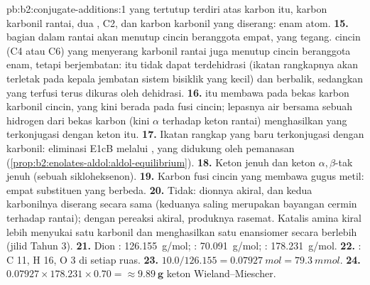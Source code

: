 \begin{solution}{pb:b2:conjugate-additions:1}
yang tertutup terdiri atas karbon itu, karbon karbonil rantai, dua ,
C2, dan karbon karbonil yang diserang: enam atom.
\textbf{15.}   bagian dalam rantai akan menutup cincin
beranggota empat, yang tegang.  cincin (C4 atau C6) yang menyerang
karbonil rantai juga menutup cincin beranggota enam, tetapi berjembatan:
 itu tidak dapat terdehidrasi (ikatan rangkapnya akan terletak pada
kepala jembatan sistem bisiklik yang kecil) dan berbalik, sedangkan 
yang terfusi terus dikuras oleh dehidrasi.
\textbf{16.}  itu membawa  pada bekas karbon karbonil cincin,
yang kini berada pada fusi cincin; lepasnya air bersama sebuah hidrogen dari
bekas karbon  (kini $\alpha$ terhadap keton rantai) menghasilkan
 yang terkonjugasi dengan keton itu.
\textbf{17.} Ikatan rangkap yang baru terkonjugasi dengan karbonil: eliminasi
E1cB melalui , yang didukung oleh pemanasan
(\cref{prop:b2:enolates-aldol:aldol-equilibrium}).
\textbf{18.} Keton jenuh dan keton $\alpha,\beta$-tak jenuh (sebuah sikloheksenon).
\textbf{19.} Karbon fusi cincin yang membawa gugus metil: empat substituen yang berbeda.
\textbf{20.} Tidak: dionnya akiral, dan kedua karbonilnya diserang secara
sama (keduanya saling merupakan bayangan cermin terhadap rantai); dengan
pereaksi akiral, produknya rasemat. Katalis amina kiral lebih menyukai satu
karbonil dan menghasilkan satu enansiomer secara berlebih (jilid Tahun 3).
\textbf{21.} Dion : \qty{126.155}{g/mol}; : \qty{70.091}{g/mol}; :
\qty{178.231}{g/mol}.
\textbf{22.} : C 11, H 16, O 3 di setiap ruas.
\textbf{23.} $10.0/126.155 = \qty{0.07927}{mol} = \qty{79.3}{mmol}$.
\textbf{24.} $0.07927 \times 178.231 \times 0.70 = \boldsymbol{\approx \qty{9.89}{g}}$
keton Wieland--Miescher.
\end{solution}
